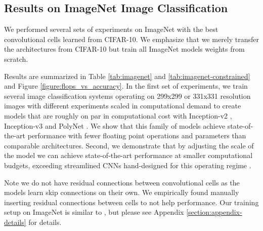 




\subsection{Results on ImageNet Image Classification}



We performed several sets of experiments on ImageNet with the best convolutional cells learned from CIFAR-10.
We emphasize that we merely transfer the architectures from CIFAR-10 but train all ImageNet models weights from scratch.

Results are summarized in Table \ref{tab:imagenet} and \ref{tab:imagenet-constrained} and Figure \ref{figure:flops_vs_accuracy}. In the first set of experiments, we train several image classification systems operating on 299x299 or 331x331 resolution images with different experiments scaled in computational demand to create models that are roughly on par in computational cost with Inception-v2 \cite{BatchNorm}, Inception-v3 \cite{szegedy2016rethinking} and PolyNet \cite{zhang2016polynet}.
We show that this family of models achieve state-of-the-art performance with fewer floating point operations and parameters than comparable architectures. Second, we demonstrate that by adjusting the scale of the model we can achieve state-of-the-art performance at smaller computational budgets, exceeding streamlined CNNs hand-designed for this operating regime \cite{howard2017mobilenets, shufflenet}.

Note we do not have residual connections between convolutional cells as the models learn skip connections on their own. We empirically found manually inserting residual connections between cells to not help performance.
Our training setup on ImageNet is similar to \cite{szegedy2016rethinking}, but please see Appendix \ref{section:appendix-details} for details.


